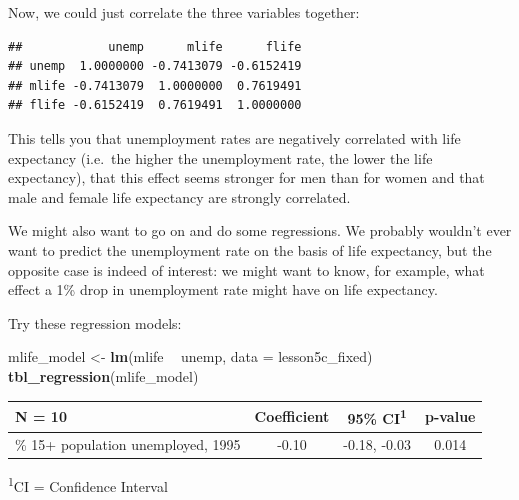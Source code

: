 \documentclass[]{book}
\newenvironment{Shaded}{\begin{snugshade}}{\end{snugshade}}
\newcommand{\CommentTok}[1]{\textcolor[rgb]{0.56,0.35,0.01}{\textit{#1}}}
\newcommand{\DataTypeTok}[1]{\textcolor[rgb]{0.13,0.29,0.53}{#1}}
\newcommand{\KeywordTok}[1]{\textcolor[rgb]{0.13,0.29,0.53}{\textbf{#1}}}
\newcommand{\NormalTok}[1]{#1}
\newcommand{\OperatorTok}[1]{\textcolor[rgb]{0.81,0.36,0.00}{\textbf{#1}}}
\newcommand{\StringTok}[1]{\textcolor[rgb]{0.31,0.60,0.02}{#1}}
\begin{document}
Now, we could just correlate the three variables together:

\begin{Shaded}
\end{Shaded}

\begin{verbatim}
##            unemp      mlife      flife
## unemp  1.0000000 -0.7413079 -0.6152419
## mlife -0.7413079  1.0000000  0.7619491
## flife -0.6152419  0.7619491  1.0000000
\end{verbatim}

This tells you that unemployment rates are negatively correlated with life expectancy (i.e.~the higher the unemployment rate, the lower the life expectancy), that this effect seems stronger for men than for women and that male and female life expectancy are strongly correlated.

We might also want to go on and do some regressions. We probably wouldn't ever want to predict the unemployment rate on the basis of life expectancy, but the opposite case is indeed of interest: we might want to know, for example, what effect a 1\% drop in unemployment rate might have on life expectancy.

Try these regression models:

\begin{Shaded}
\begin{Highlighting}[]
\NormalTok{mlife_model <-}\StringTok{ }\KeywordTok{lm}\NormalTok{(mlife }\OperatorTok{~}\StringTok{ }\NormalTok{unemp, }\DataTypeTok{data =}\NormalTok{ lesson5c_fixed)}
\KeywordTok{tbl_regression}\NormalTok{(mlife_model)}
\end{Highlighting}
\end{Shaded}

\captionsetup[table]{labelformat=empty,skip=1pt}
\begin{longtable}{lccc}
\toprule
\textbf{N = 10} & \textbf{Coefficient} & \textbf{95\% CI}\textsuperscript{1} & \textbf{p-value} \\ 
\midrule
\% 15+ population unemployed, 1995 & -0.10 & -0.18, -0.03 & 0.014 \\ 
\bottomrule
\end{longtable}
\vspace{-5mm}
\begin{minipage}{\linewidth}
\textsuperscript{1}CI = Confidence Interval \\ 
\end{minipage}
\end{document}
